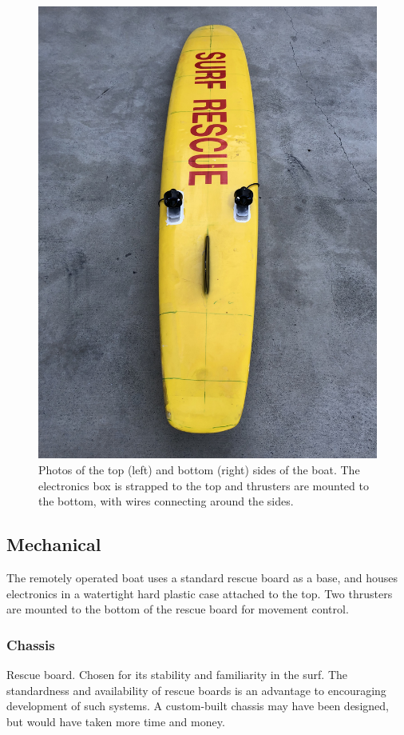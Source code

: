 \documentclass[a4paper]{IEEEtran}
\begin{document}
\begin{figure}[h!]
\begin{minipage}{0.5\columnwidth}
\includegraphics[width=\textwidth]{boat-bottom.jpg}
\end{minipage}
\caption{Photos of the top (left) and bottom (right) sides of the boat. The electronics box is strapped to the top and thrusters are mounted to the bottom, with wires connecting around the sides.}
\label{boatpics}
\end{figure}

\subsection{Mechanical}
The remotely operated boat uses a standard rescue board as a base, and houses electronics in a watertight hard plastic case attached to the top. Two thrusters are mounted to the bottom of the rescue board for movement control.

\subsubsection{Chassis}
Rescue board. Chosen for its stability and familiarity in the surf. The standardness and availability of rescue boards is an advantage to encouraging development of such systems. A custom-built chassis may have been designed, but would have taken more time and money. 
\end{document}
